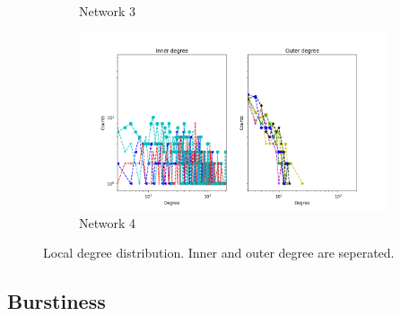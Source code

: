\documentclass[a4paper, 12pt]{article}
\begin{document}
\begin{figure}
\begin{subfigure}[b]{0.475\textwidth}
            \caption[]%
            {{\small Network 3}}    
            \label{fig:mean and std of net34}
        \end{subfigure}
        \quad
        \begin{subfigure}[b]{0.475\textwidth}   
            \centering 
            \includegraphics[width=\textwidth]{img/corpus/dancer_4/figure_2}
            \caption[]%
            {{\small Network 4}}    
            \label{fig:mean and std of net44}
        \end{subfigure}
        \caption[ The average and standard deviation of critical parameters ]
        {\small Local degree distribution. Inner and outer degree are seperated.} 
        \label{fig:mean and std of nets}
    \end{figure}

\subsection{Burstiness}
\clearpage
\end{document}
